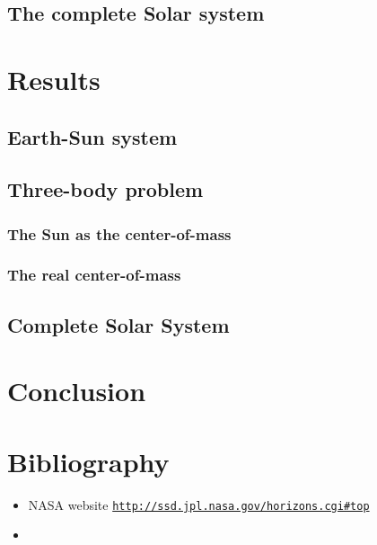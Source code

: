 \documentclass[a4paper, twoside, 11pt]{report}
\theoremstyle{theorem}
\theoremstyle{remark}
\theoremstyle{exemple}
\begin{document}
    
    \section{The complete Solar system}
    
    

\chapter{Results}

    \section{Earth-Sun system}  
        \subsection{} 
    
    
    \section{Three-body problem}
        \subsection{The Sun as the center-of-mass}
        
        \subsection{The real center-of-mass}
    
    
    \section{Complete Solar System}
        \subsection{}
        
        \subsection{}
    
    

\chapter*{Conclusion}

    \paragraph{}
    
    
    
    
\chapter*{Bibliography}
    \begin{itemize}
        \item NASA website \href{{http://ssd.jpl.nasa.gov/horizons.cgi#top}}{\nolinkurl{http://ssd.jpl.nasa.gov/horizons.cgi\#top}}
        \item 
    \end{itemize}
    
    
    
    
    
    
    
    
    
    
\end{document}
